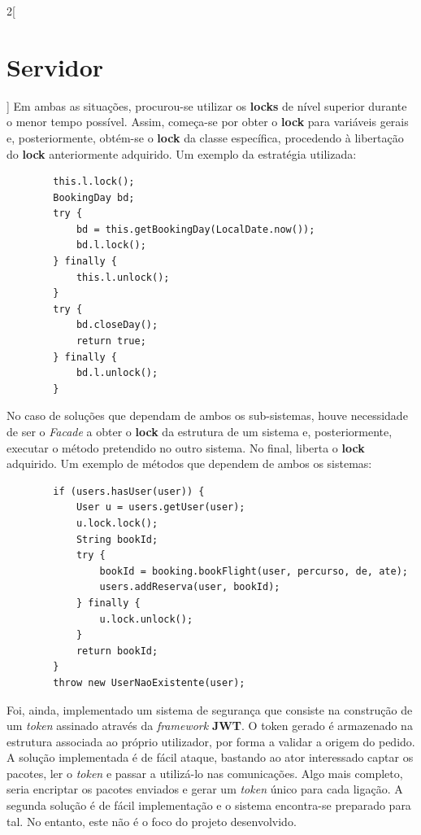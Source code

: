 \documentclass[a4paper,11pt]{article}
\begin{document}
\begin{multicols}{2}[\section{Servidor}]
    Em ambas as situações, procurou-se utilizar os \textbf{locks} de nível superior
    durante o menor tempo possível.
    Assim, começa-se por obter o \textbf{lock} para variáveis gerais e, posteriormente,
    obtém-se o \textbf{lock} da classe específica, procedendo à libertação do \textbf{lock}
    anteriormente adquirido.
    Um exemplo da estratégia utilizada:
    \begin{verbatim}
		this.l.lock();
		BookingDay bd;
		try {
			bd = this.getBookingDay(LocalDate.now());
			bd.l.lock();
		} finally {
			this.l.unlock();
		}
		try {
			bd.closeDay();
			return true;
		} finally {
			bd.l.unlock();
		}
    \end{verbatim}
    No caso de soluções que dependam de ambos os sub-sistemas, houve necessidade
    de ser o \textit{Facade} a obter o \textbf{lock} da estrutura de um sistema e,
    posteriormente, executar o método pretendido no outro sistema.
    No final, liberta o \textbf{lock} adquirido.
    Um exemplo de métodos que dependem de ambos os sistemas:
    \begin{verbatim}
		if (users.hasUser(user)) {
			User u = users.getUser(user);
			u.lock.lock();
			String bookId;
			try {
				bookId = booking.bookFlight(user, percurso, de, ate);
				users.addReserva(user, bookId);
			} finally {
				u.lock.unlock();
			}
			return bookId;
		}
		throw new UserNaoExistente(user);
    \end{verbatim}
    
    Foi, ainda, implementado um sistema de segurança que consiste na construção de um
    \textit{token} assinado através da \textit{framework} \textbf{JWT}.
    O token gerado é armazenado na estrutura associada ao próprio utilizador, por forma a
    validar a origem do pedido.
    A solução implementada é de fácil ataque, bastando ao ator interessado captar os pacotes,
    ler o \textit{token} e passar a utilizá-lo nas comunicações.
    Algo mais completo, seria encriptar os pacotes enviados e gerar um \textit{token} único
    para cada ligação. A segunda solução é de fácil implementação e o sistema encontra-se
    preparado para tal. No entanto, este não é o foco do projeto desenvolvido.
\end{multicols}
\end{document}
